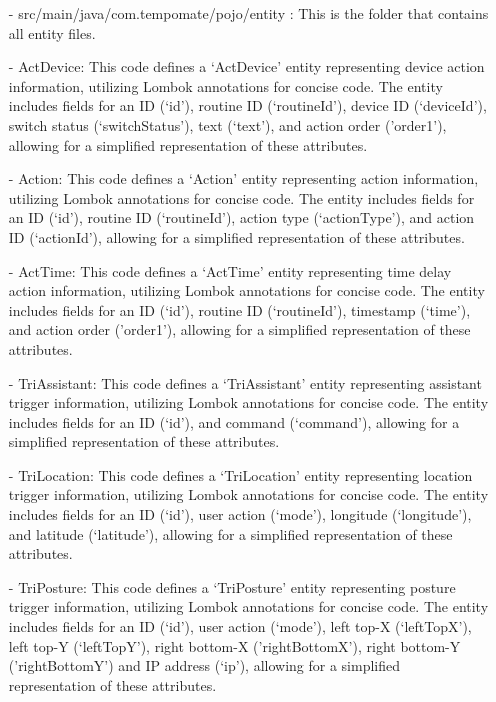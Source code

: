 \begin{enumerate}
    \item[-] src/main/java/com.tempomate/pojo/entity : This is the folder that contains all entity files. \\
    \item[-] ActDevice: This code defines a ‘ActDevice' entity representing device action information, utilizing Lombok annotations for concise code. The entity includes fields for an ID (‘id’), routine ID (‘routineId’), device ID (‘deviceId’), switch status (‘switchStatus’), text (‘text’), and action order ('order1'), allowing for a simplified representation of these attributes.\\
    \item[-] Action: This code defines a ‘Action' entity representing action information, utilizing Lombok annotations for concise code. The entity includes fields for an ID (‘id’), routine ID (‘routineId’), action type (‘actionType’), and action ID (‘actionId’), allowing for a simplified representation of these attributes. \\
    \item[-] ActTime: This code defines a ‘ActTime' entity representing time delay action information, utilizing Lombok annotations for concise code. The entity includes fields for an ID (‘id’), routine ID (‘routineId’), timestamp (‘time’), and action order ('order1'), allowing for a simplified representation of these attributes.\\
    \item[-] TriAssistant: This code defines a ‘TriAssistant' entity representing assistant trigger information, utilizing Lombok annotations for concise code. The entity includes fields for an ID (‘id’), and command (‘command’), allowing for a simplified representation of these attributes.\\
    \item[-] TriLocation: This code defines a ‘TriLocation' entity representing location trigger information, utilizing Lombok annotations for concise code. The entity includes fields for an ID (‘id’), user action (‘mode’), longitude (‘longitude’), and latitude (‘latitude’), allowing for a simplified representation of these attributes.\\
    \item[-] TriPosture: This code defines a ‘TriPosture' entity representing posture trigger information, utilizing Lombok annotations for concise code. The entity includes fields for an ID (‘id’), user action (‘mode’), left top-X (‘leftTopX’), left top-Y (‘leftTopY’), right bottom-X ('rightBottomX'), right bottom-Y ('rightBottomY') and IP address (‘ip’), allowing for a simplified representation of these attributes. \\

\end{enumerate}
